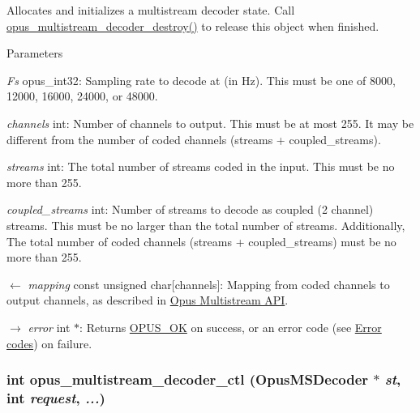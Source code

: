 Allocates and initializes a multistream decoder state. Call \hyperlink{group__opus__multistream_gaaec72b484eabc78d7869221c6d2ce080}{opus\_\-multistream\_\-decoder\_\-destroy()} to release this object when finished. 
\begin{DoxyParams}{Parameters}
\item[{\em Fs}]{\ttfamily opus\_\-int32}: Sampling rate to decode at (in Hz). This must be one of 8000, 12000, 16000, 24000, or 48000. \item[{\em channels}]{\ttfamily int}: Number of channels to output. This must be at most 255. It may be different from the number of coded channels ({\ttfamily streams + coupled\_\-streams}). \item[{\em streams}]{\ttfamily int}: The total number of streams coded in the input. This must be no more than 255. \item[{\em coupled\_\-streams}]{\ttfamily int}: Number of streams to decode as coupled (2 channel) streams. This must be no larger than the total number of streams. Additionally, The total number of coded channels ({\ttfamily streams + coupled\_\-streams}) must be no more than 255. \item[\mbox{$\leftarrow$} {\em mapping}]{\ttfamily const unsigned char\mbox{[}channels\mbox{]}}: Mapping from coded channels to output channels, as described in \hyperlink{group__opus__multistream}{Opus Multistream API}. \item[\mbox{$\rightarrow$} {\em error}]{\ttfamily int $\ast$}: Returns \hyperlink{group__opus__errorcodes_gaa44cf8a185e1b5cb940ef63eb4f02d21}{OPUS\_\-OK} on success, or an error code (see \hyperlink{group__opus__errorcodes}{Error codes}) on failure. \end{DoxyParams}
\hypertarget{group__opus__multistream_ga4b3dca8d46e5868cc133f3f6d2b57688}{
\subsubsection[{opus\_\-multistream\_\-decoder\_\-ctl}]{\setlength{\rightskip}{0pt plus 5cm}int opus\_\-multistream\_\-decoder\_\-ctl ({\bf OpusMSDecoder} $\ast$ {\em st}, \/  int {\em request}, \/   {\em ...})}}
\label{group__opus__multistream_ga4b3dca8d46e5868cc133f3f6d2b57688}


